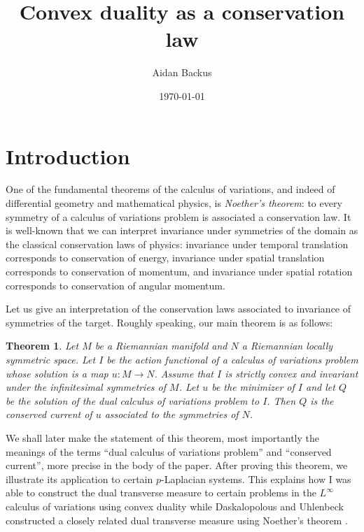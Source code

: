 \documentclass[reqno,11pt]{amsart}
\title{Convex duality as a conservation law}
\author{Aidan Backus}
\date{\today}
\newcommand{\dfn}[1]{\emph{#1}\index{#1}}
\newtheorem{mainthm}{Theorem}
\theoremstyle{definition}
\numberwithin{equation}{section}
\begin{document}
\begin{abstract}
    
\end{abstract}

\maketitle

\section{Introduction}
One of the fundamental theorems of the calculus of variations, and indeed of differential geometry and mathematical physics, is \dfn{Noether's theorem}: to every symmetry of a calculus of variations problem is associated a conservation law.
It is well-known that we can interpret invariance under symmetries of the domain as the classical conservation laws of physics: invariance under temporal translation corresponds to conservation of energy, invariance under spatial translation corresponds to conservation of momentum, and invariance under spatial rotation corresponds to conservation of angular momentum.

Let us give an interpretation of the conservation laws associated to invariance of symmetries of the target.
Roughly speaking, our main theorem is as follows:

\begin{mainthm}
Let $M$ be a Riemannian manifold and $N$ a Riemannian locally symmetric space.
Let $I$ be the action functional of a calculus of variations problem whose solution is a map $u: M \to N$.
Assume that $I$ is strictly convex and invariant under the infinitesimal symmetries of $M$.
Let $u$ be the minimizer of $I$ and let $Q$ be the solution of the dual calculus of variations problem to $I$.
Then $Q$ is the conserved current of $u$ associated to the symmetries of $N$.
\end{mainthm}

We shall later make the statement of this theorem, most importantly the meanings of the terms ``dual calculus of variations problem'' and ``conserved current'', more precise in the body of the paper.
After proving this theorem, we illustrate its application to certain $p$-Laplacian systems.
This explains how I was able to construct the dual transverse measure to certain problems in the $L^\infty$ calculus of variations using convex duality \cite{BackusBest1} while Daskalopolous and Uhlenbeck constructed a closely related dual transverse measure using Noether's theorem \cite{daskalopoulos2022}.
\end{document}
